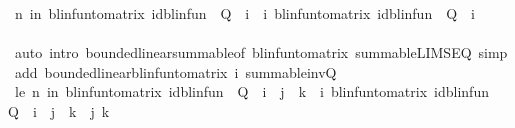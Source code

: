 \begin{isabellebody}
\ {\isachardoublequoteopen}{\isacharparenleft}{\kern0pt}{\isasymlambda}n{\isachardot}{\kern0pt}\ {\isacharparenleft}{\kern0pt}{\isasymSum}i{\isacharless}{\kern0pt}n{\isachardot}{\kern0pt}\ blinfun{\isacharunderscore}{\kern0pt}to{\isacharunderscore}{\kern0pt}matrix\ {\isacharparenleft}{\kern0pt}{\isacharparenleft}{\kern0pt}id{\isacharunderscore}{\kern0pt}blinfun\ {\isacharminus}{\kern0pt}\ Q{}{\isacharparenright}{\kern0pt}\ {\isacharcircum}{\kern0pt}{\isacharcircum}{\kern0pt}\ i{\isacharparenright}{\kern0pt}{\isacharparenright}{\kern0pt}{\isacharparenright}{\kern0pt}\ {\isasymlonglonglongrightarrow}\ {\isacharparenleft}{\kern0pt}{\isasymSum}i{\isachardot}{\kern0pt}\ blinfun{\isacharunderscore}{\kern0pt}to{\isacharunderscore}{\kern0pt}matrix\ {\isacharparenleft}{\kern0pt}{\isacharparenleft}{\kern0pt}id{\isacharunderscore}{\kern0pt}blinfun\ {\isacharminus}{\kern0pt}\ Q{}{\isacharparenright}{\kern0pt}\ {\isacharcircum}{\kern0pt}{\isacharcircum}{\kern0pt}\ i{\isacharparenright}{\kern0pt}{\isacharparenright}{\kern0pt}{\isachardoublequoteclose}\isanewline
\ \ \ \ \ \ \isamarkupfalse%
\ {\isacharparenleft}{\kern0pt}auto\ intro{\isacharbang}{\kern0pt}{\isacharcolon}{\kern0pt}\ bounded{\isacharunderscore}{\kern0pt}linear{\isachardot}{\kern0pt}summable{\isacharbrackleft}{\kern0pt}of\ blinfun{\isacharunderscore}{\kern0pt}to{\isacharunderscore}{\kern0pt}matrix{\isacharbrackright}{\kern0pt}\ summable{\isacharunderscore}{\kern0pt}LIMSEQ\ simp\ add{\isacharcolon}{\kern0pt}\ bounded{\isacharunderscore}{\kern0pt}linear{\isacharunderscore}{\kern0pt}blinfun{\isacharunderscore}{\kern0pt}to{\isacharunderscore}{\kern0pt}matrix\ i{}{\isacharparenleft}{\kern0pt}{}{\isacharparenright}{\kern0pt}\ summable{\isacharunderscore}{\kern0pt}inv{\isacharunderscore}{\kern0pt}Q{\isacharparenright}{\kern0pt}\isanewline
\ \ \ \ \isamarkupfalse%
\ le{}{\isacharcolon}{\kern0pt}\ {\isachardoublequoteopen}{\isacharparenleft}{\kern0pt}{\isasymlambda}n{\isachardot}{\kern0pt}\ {\isacharparenleft}{\kern0pt}{\isasymSum}i{\isacharless}{\kern0pt}n{\isachardot}{\kern0pt}\ blinfun{\isacharunderscore}{\kern0pt}to{\isacharunderscore}{\kern0pt}matrix\ {\isacharparenleft}{\kern0pt}{\isacharparenleft}{\kern0pt}id{\isacharunderscore}{\kern0pt}blinfun\ {\isacharminus}{\kern0pt}\ Q{}{\isacharparenright}{\kern0pt}\ {\isacharcircum}{\kern0pt}{\isacharcircum}{\kern0pt}\ i{\isacharparenright}{\kern0pt}{\isacharparenright}{\kern0pt}\ {\isachardollar}{\kern0pt}\ j\ {\isachardollar}{\kern0pt}\ k{\isacharparenright}{\kern0pt}\ {\isasymlonglonglongrightarrow}\ {\isacharparenleft}{\kern0pt}{\isasymSum}i{\isachardot}{\kern0pt}\ blinfun{\isacharunderscore}{\kern0pt}to{\isacharunderscore}{\kern0pt}matrix\ {\isacharparenleft}{\kern0pt}{\isacharparenleft}{\kern0pt}id{\isacharunderscore}{\kern0pt}blinfun\ {\isacharminus}{\kern0pt}\ Q{}{\isacharparenright}{\kern0pt}\ {\isacharcircum}{\kern0pt}{\isacharcircum}{\kern0pt}\ i{\isacharparenright}{\kern0pt}{\isacharparenright}{\kern0pt}\ {\isachardollar}{\kern0pt}\ j\ {\isachardollar}{\kern0pt}\ k{\isachardoublequoteclose}\ \ j\ k\isanewline

\end{isabellebody}
